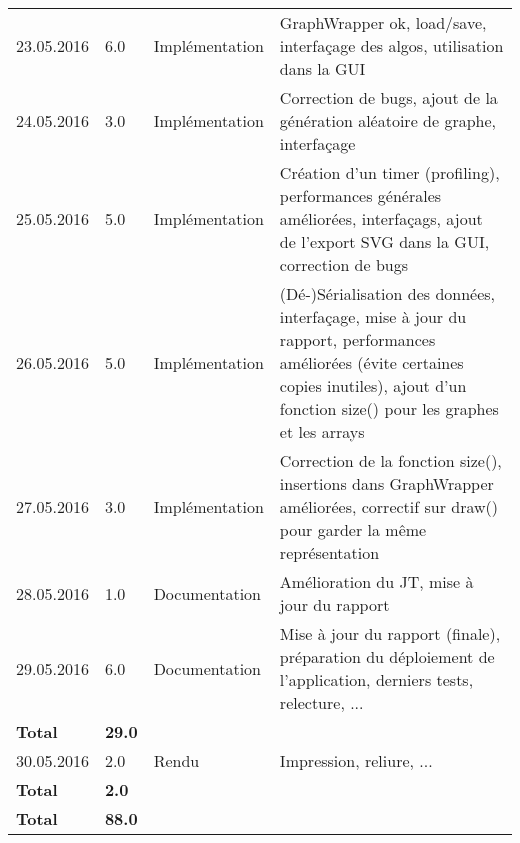 \documentclass[french]{article}
\begin{document}
\begin{longtable}{p{}|p{}|p{}|p{}}
		\hline
		23.05.2016 & 6.0 & Implémentation & GraphWrapper ok, load/save, interfaçage des algos, utilisation dans la GUI\\
		24.05.2016 & 3.0 & Implémentation & Correction de bugs, ajout de la génération aléatoire de graphe, interfaçage\\
		25.05.2016 & 5.0 & Implémentation & Création d'un timer (profiling), performances générales améliorées, interfaçags, ajout de l'export SVG dans la GUI, correction de bugs\\
		26.05.2016 & 5.0 & Implémentation & (Dé-)Sérialisation des données, interfaçage, mise à jour du rapport, performances améliorées (évite certaines copies inutiles), ajout d'un fonction size() pour les graphes et les arrays\\
		27.05.2016 & 3.0 & Implémentation & Correction de la fonction size(), insertions dans GraphWrapper améliorées, correctif sur draw() pour garder la même représentation\\
		28.05.2016 & 1.0 & Documentation & Amélioration du JT, mise à jour du rapport\\
		29.05.2016 & 6.0 & Documentation & Mise à jour du rapport (finale), préparation du déploiement de l'application, derniers tests, relecture, ...\\  
		\textbf{Total} & \textbf{29.0} &&\\
		\hline
		30.05.2016 & 2.0 & Rendu & Impression, reliure, ...\\
		\textbf{Total} & \textbf{2.0} && \\
		\hline
		\hline
		\textbf{Total} & \textbf{88.0} &&\\
	\end{longtable}
	
\end{document}
